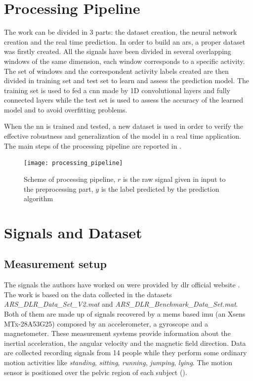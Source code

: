
\section{Processing Pipeline}
\label{sec:processing_architecture}
The work can be divided in 3 parts: the dataset creation, the neural network creation and the real time prediction.
In order to build an \gls{ars}, a proper dataset was firstly created. All the signals have been divided in several overlapping windows of the same dimension, each window corresponds to a specific activity. The set of windows and the correspondent activity labels created are then divided in training set and test set to learn and assess the prediction model.
The training set is used to fed a \gls{cnn} made by 1D convolutional layers and fully connected layers while the test set is used to assess the accuracy of the learned model and to avoid overfitting problems.

When the \gls{nn} is trained and tested, a new dataset is used in order to verify the effective robustness and generalization of the model in a real time application.
The main steps of the processing pipeline are reported in .

\begin{figure}[htp]
\texttt{[image: processing\_pipeline]}
\caption{Scheme of processing pipeline, $r$ is the raw signal given in input to the preprocessing part, $y$ is the label predicted by the prediction algorithm}
\label{fig:processing_pipeline}
\end{figure}


\section{Signals and Dataset}
\label{sec:model}

\subsection{Measurement setup}
The signals the authors have worked on were provided by \gls{dlr} official website \cite{DLR}. The work is based on the data collected in the datasets  \textit{ARS\_DLR\_Data\_Set\_V2.mat} and \textit{ARS\_DLR\_Benchmark\_Data\_Set.mat}.
Both of them are made up of signals recovered by a \gls{mems} based \gls{imu} (an Xsens MTx-28A53G25) composed by an accelerometer, a gyroscope and a magnetometer. These measurement systems provide information about the inertial acceleration, the angular velocity and the magnetic field direction.
Data are collected recording signals from 14 people while they perform some ordinary motion activities like \textit{standing}, \textit{sitting}, \textit{running}, \textit{jumping}, \textit{lying}. The motion sensor is positioned over the pelvic region of each subject ().

